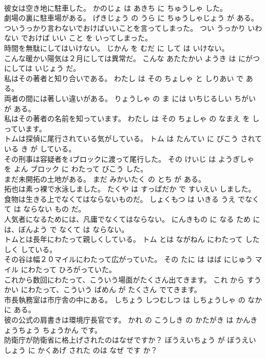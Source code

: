 \documentclass[8pt]{extreport}
\begin{document}
\begin{CJK}{UTF8}{min}
\\	彼女は空き地に駐車した。	かのじょ は あきち に ちゅうしゃ した。	
\\	劇場の裏に駐車場がある。	げきじょう の うら に ちゅうしゃじょう が ある。	
\\	ついうっかり言わないでおけばいいことを言ってしまった。	つい うっかり いわない でおけば いい こと を いってしまった。	
\\	時間を無駄にしてはいけない。	じかん を むだ に して は いけない。	
\\	こんな暖かい陽気は２月にしては異常だ。	こんな あたたかい ようき は にがつ にしては いじょう だ。	
\\	私はその著者と知り合いである。	わたし は その ちょしゃ と しりあい で ある。	
\\	両者の間には著しい違いがある。	りょうしゃ の ま には いちじるしい ちがい が ある。	
\\	私はその著者の名前を知っています。	わたし は その ちょしゃ の なまえ を しっています。	
\\	トムは探偵に尾行されている気がしている。	トム は たんてい に びこう されている き が している。	
\\	その刑事は容疑者を4ブロックに渡って尾行した。	その けいじ は ようぎしゃ を よん ブロック に わたって びこう した。	
\\	まだ未開拓の土地がある。	まだ みかいたく の とち が ある。	
\\	拓也は素っ裸で水泳しました。	たくや は すっぱだか で すいえい しました。	
\\	食物は生きる上でなくてはならないものだ。	しょくもつ は いきる うえ でなくて は ならない もの だ。	
\\	人気者になるためには、凡庸でなくてはならない。	にんきもの に なる ため には、ぼんよう で なくて は ならない。	
\\	トムとは長年にわたって親しくしている。	トム とは ながねん にわたって したしく している。	
\\	その谷は幅２０マイルにわたって広がっていた。	その たに は はば にじゅう マイル にわたって ひろがっていた。	
\\	これから数回にわたって、こういう場面がたくさん出てきます。	これ から すうかい にわたって、こういう ばめん が たくさん でてきます。	
\\	市長執務室は市庁舎の中にある。	しちょう しつむしつ は しちょうしゃ の なか に ある。	
\\	彼の公式の肩書きは環境庁長官です。	かれ の こうしき の かたがき は かんきょうちょう ちょうかん です。	
\\	防衛庁が防衛省に格上げされたのはなぜですか？	ぼうえいちょう が ぼうえいしょう に かくあげ された のは なぜ です か？	

\end{CJK}
\end{document}
